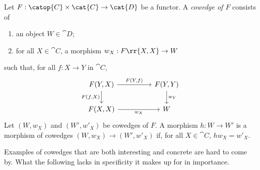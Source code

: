 \begin{definition}\label{def:cowedge}
  Let $F:\catop{C}\times\cat{C}\to\cat{D}$ be a functor. A \emph{cowedge of $F$} consists of
  \begin{enumerate}
    \item an object $W\in\cat{D}$;
    \item for all $X\in\cat{C}$, a morphism $w_X:F\rr{X,X}\to W$
  \end{enumerate}
  such that, for all $f:X\to Y$ in $\cat{C}$,
  \begin{equation}\label{eq:cowedge_property}
    \begin{tikzcd}
      {F(Y,X)} && {F(Y,Y)} \\
      {F(X,X)} && W
      \arrow["{w_X}"', from=2-1, to=2-3]
      \arrow["{w_Y}", from=1-3, to=2-3]
      \arrow["{F(Y,f)}", from=1-1, to=1-3]
      \arrow["{F(f,X)}"', from=1-1, to=2-1]
    \end{tikzcd}
  \end{equation}
  Let $(W,w_X)$ and $(W',w'_X)$ be cowedges of $F$. A morphism $h:W\to W'$ is a morphism of
  cowedges $(W,w_X)\to(W',w'_X)$ if, for all $X\in\cat{C}$, $hw_X=w'_X$.
\end{definition}

Examples of cowedges that are both interesting and concrete are hard to come by.
What the following lacks in specificity it makes up for in importance.

